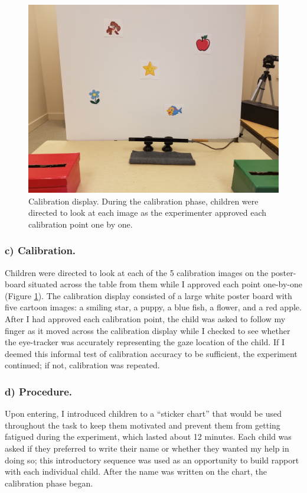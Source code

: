 \documentclass[floatsintext,man]{apa6}
\theoremstyle{definition}
\theoremstyle{definition}
\theoremstyle{definition}
\theoremstyle{remark}
\begin{document}
\begin{figure}
\centering
\includegraphics{../images/calibration.jpg}
\caption{\label{fig:calibration}Calibration display. During the calibration
phase, children were directed to look at each image as the experimenter
approved each calibration point one by one.}
\end{figure}

\subsubsection{c) Calibration.}\label{c-calibration.}

Children were directed to look at each of the 5 calibration images on
the poster-board situated across the table from them while I approved
each point one-by-one (Figure \ref{fig:calibration}). The calibration
display consisted of a large white poster board with five cartoon
images: a smiling star, a puppy, a blue fish, a flower, and a red apple.
After I had approved each calibration point, the child was asked to
follow my finger as it moved across the calibration display while I
checked to see whether the eye-tracker was accurately representing the
gaze location of the child. If I deemed this informal test of
calibration accuracy to be sufficient, the experiment continued; if not,
calibration was repeated.

\subsubsection{d) Procedure.}\label{d-procedure.}

Upon entering, I introduced children to a \enquote{sticker chart} that
would be used throughout the task to keep them motivated and prevent
them from getting fatigued during the experiment, which lasted about 12
minutes. Each child was asked if they preferred to write their name or
whether they wanted my help in doing so; this introductory sequence was
used as an opportunity to build rapport with each individual child.
After the name was written on the chart, the calibration phase began.
\end{document}
